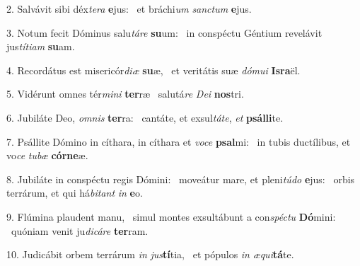 2. Salvávit sibi déx\textit{te}\textit{ra} \textbf{e}jus: \ast\  et bráchi\textit{um} \textit{sanc}\textit{tum} \textbf{e}jus.\

3. Notum fecit Dóminus salu\textit{tá}\textit{re} \textbf{su}um: \ast\  in conspéctu Géntium revelávit jus\textit{tí}\textit{ti}\textit{am} \textbf{su}am.\

4. Recordátus est misericór\textit{di}\textit{æ} \textbf{su}æ, \ast\  et veritátis suæ \textit{dó}\textit{mu}\textit{i} \textbf{Is}\textbf{ra}ël.\

5. Vidérunt omnes tér\textit{mi}\textit{ni} \textbf{ter}ræ \ast\  salutá\textit{re} \textit{De}\textit{i} \textbf{nos}tri.\

6. Jubiláte Deo, \textit{om}\textit{nis} \textbf{ter}ra: \ast\  cantáte, et exsul\textit{tá}\textit{te}, \textit{et} \textbf{psál}\textbf{li}te.\

7. Psállite Dómino in cíthara, in cíthara et \textit{vo}\textit{ce} \textbf{psal}mi: \ast\  in tubis ductílibus, et vo\textit{ce} \textit{tu}\textit{bæ} \textbf{cór}\textbf{ne}æ.\

8. Jubiláte in conspéctu regis Dómini: \dag\  moveátur mare, et pleni\textit{tú}\textit{do} \textbf{e}jus: \ast\  orbis terrárum, et qui há\textit{bi}\textit{tant} \textit{in} \textbf{e}o.\

9. Flúmina plaudent manu, \dag\  simul montes exsultábunt a con\textit{spéc}\textit{tu} \textbf{Dó}mini: \ast\  quóniam venit ju\textit{di}\textit{cá}\textit{re} \textbf{ter}ram.\

10. Judicábit orbem terrárum \textit{in} \textit{jus}\textbf{tí}tia, \ast\  et pópulos \textit{in} \textit{æ}\textit{qui}\textbf{tá}te.\

